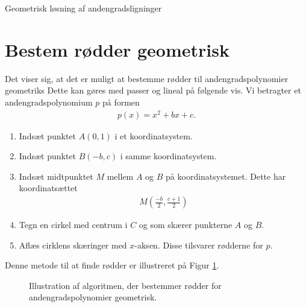 \begin{center}
\Huge
	Geometrisk løsning af andengradsligninger
\end{center}
\section*{Bestem rødder geometrisk}

Det viser sig, at det er muligt at bestemme rødder til andengradspolynomier geometriks Dette kan gøres med passer og lineal på følgende vis. Vi betragter et andengradspolynomium $p$ på formen
\begin{align*}
	p(x) = x^2 +bx + c.
\end{align*}
\begin{enumerate}[label=\roman*)]
	\item Indsæt punktet $A(0,1)$ i et koordinatsystem.
	\item Indsæt punktet $B(-b,c)$ i samme koordinatsystem. 
	\item Indsæt midtpunktet $M$ mellem $A$ og $B$ på koordinatsystemet. Dette har koordinatsættet
	\begin{align*}
		M\left(\frac{-b}{2},\frac{c+1}{2}\right)
	\end{align*}
	\item Tegn en cirkel med centrum i $C$ og som skærer punkterne $A$ og $B$. 
	\item Aflæs cirklens skæringer med $x$-aksen. Disse tilsvarer rødderne for $p$. 
\end{enumerate}

Denne metode til at finde rødder er illustreret på Figur \ref{fig:algoritme}.

\begin{figure}[H]
	\centering
	\caption{Illustration af algoritmen, der bestemmer rødder for andengradspolynomier geometrisk.}
	\label{fig:algoritme}
\end{figure}

